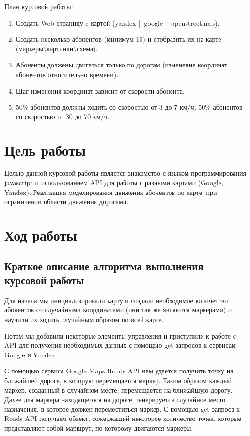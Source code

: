 \documentclass[a4paper]{article}
\begin{document}
\begin{onehalfspacing}
План курсовой работы:
\begin{enumerate}
	\item Создать Web-страницу c картой (yandex || google || openstreetmap).

	\item Создать несколько абонентов (минимум 10) и отобразить их на карте (маркеры\textbackslash картинки\textbackslash схема).

	\item Абоненты должены двигаться только по дорогам (изменение координат абонентов относительно времени).

	\item Шаг изменения координат зависит от скорости абонента.

	\item 50\% абонентов должны ходить со скоростью от 3 до 7 км/ч, 50\% абонентов со скоростью от 30 до 70 км/ч.
\end{enumerate}


\section{Цель работы}

\tab Целью данной курсовой работы является знакомство с языком программирования javascript и использованием API для работы с разными картами (Google, Yandex). Реализация моделирования движения абонентов по карте, при ограничении области движения дорогами. 

\clearpage
\section{Ход работы}
\subsection*{Краткое описание алгоритма выполнения курсовой работы}

\tab Для начала мы инициализировали карту и создали необходимое количетсво абонентов со случайными координатами (они так же являются маркерами) и научили их ходить случайным образом по всей карте.

Потом мы добавили некоторые элементы управления и приступили к работе с API для получения необходимых данных с помощью get-запросов к сервисам Google и Yandex. 

С помощью сервиса Google Maps Roads API нам удается получить точку на ближайшей дороге, в которую перемещается маркер. Таким образом каждый маркер, созданный в случайном месте, перемещается на ближайшую дорогу. Далее для маркера находящегося на дороге, генерируется случайное место назначения, в которое должен переместиться маркер. С помощью get-запроса к Roads API  получаем обьект, сожержащий некоторое количество точек, которые представляют собой маршрут, по которому двигаются маркеры. 


\end{onehalfspacing}
\end{document}
